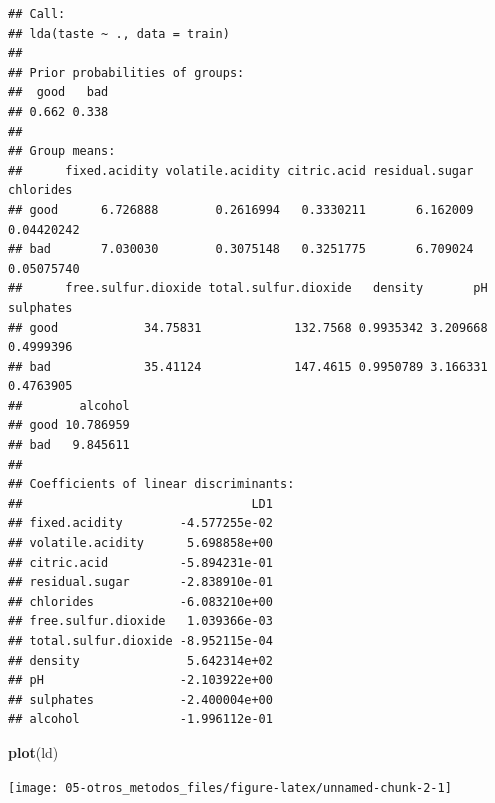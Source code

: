 \documentclass[
  spanish,
]{book}
\newenvironment{Shaded}{\begin{snugshade}}{\end{snugshade}}
\newcommand{\DataTypeTok}[1]{\textcolor[rgb]{0.13,0.29,0.53}{#1}}
\newcommand{\KeywordTok}[1]{\textcolor[rgb]{0.13,0.29,0.53}{\textbf{#1}}}
\newcommand{\NormalTok}[1]{#1}
\newcommand{\OperatorTok}[1]{\textcolor[rgb]{0.81,0.36,0.00}{\textbf{#1}}}
\newcommand{\StringTok}[1]{\textcolor[rgb]{0.31,0.60,0.02}{#1}}
\theoremstyle{break}
\theoremstyle{definition}
\theoremstyle{definition}
\theoremstyle{definition}
\theoremstyle{remark}
\begin{document}
\begin{verbatim}
## Call:
## lda(taste ~ ., data = train)
## 
## Prior probabilities of groups:
##  good   bad 
## 0.662 0.338 
## 
## Group means:
##      fixed.acidity volatile.acidity citric.acid residual.sugar  chlorides
## good      6.726888        0.2616994   0.3330211       6.162009 0.04420242
## bad       7.030030        0.3075148   0.3251775       6.709024 0.05075740
##      free.sulfur.dioxide total.sulfur.dioxide   density       pH sulphates
## good            34.75831             132.7568 0.9935342 3.209668 0.4999396
## bad             35.41124             147.4615 0.9950789 3.166331 0.4763905
##        alcohol
## good 10.786959
## bad   9.845611
## 
## Coefficients of linear discriminants:
##                                LD1
## fixed.acidity        -4.577255e-02
## volatile.acidity      5.698858e+00
## citric.acid          -5.894231e-01
## residual.sugar       -2.838910e-01
## chlorides            -6.083210e+00
## free.sulfur.dioxide   1.039366e-03
## total.sulfur.dioxide -8.952115e-04
## density               5.642314e+02
## pH                   -2.103922e+00
## sulphates            -2.400004e+00
## alcohol              -1.996112e-01
\end{verbatim}

\begin{Shaded}
\begin{Highlighting}[]
\KeywordTok{plot}\NormalTok{(ld)}
\end{Highlighting}
\end{Shaded}

\begin{center}\texttt{[image: 05-otros\_metodos\_files/figure-latex/unnamed-chunk-2-1]} \end{center}

\begin{Shaded}
\end{Shaded}
\end{document}

